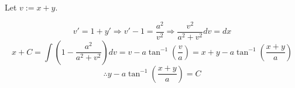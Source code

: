 \item

Let $v := x + y$.

\[
	v' = 1 + y'
	\Rightarrow v' - 1 = \frac{a^2}{v^2}
	\Rightarrow \frac{v^2}{a^2 + v^2} dv = dx
\]
\[
	x + C
	= \int \left( 1 - \frac{a^2}{a^2 + v^2} \right)dv
	= v - a \tan^{-1} \left( \frac{v}{a} \right)
	= x + y - a \tan^{-1} \left( \frac{x + y}{a} \right)
\]
\[
	\therefore y - a \tan^{-1} \left( \frac{x + y}{a} \right) = C
\]
